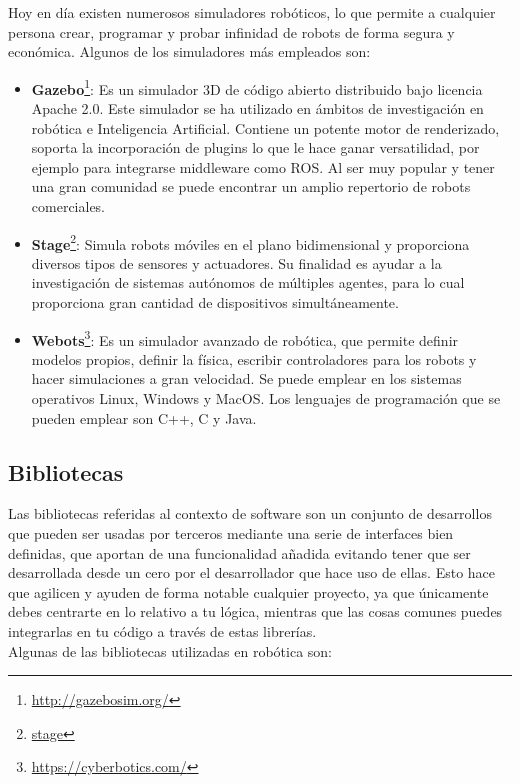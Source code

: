 Hoy en día existen numerosos simuladores robóticos, lo que permite a cualquier persona crear, programar y probar infinidad de robots de forma segura y económica. Algunos de los simuladores más empleados son:

\begin{itemize}
\item \textbf{Gazebo}\footnote{\url{http://gazebosim.org/}}: Es un simulador 3D de código abierto distribuido bajo licencia Apache 2.0. Este simulador se ha utilizado en ámbitos de investigación en robótica e Inteligencia Artificial. Contiene un potente motor de renderizado, soporta la incorporación de plugins lo que le hace ganar versatilidad, por ejemplo para integrarse middleware como ROS. Al ser muy popular y tener una gran comunidad se puede encontrar un amplio repertorio de robots comerciales.
\item \textbf{Stage}\footnote{\href{http://playerstage.sourceforge.net/index.php?src=stage}{stage}}: Simula robots móviles en el plano bidimensional y proporciona diversos tipos de sensores y actuadores. Su finalidad es ayudar a la investigación de sistemas autónomos de múltiples agentes, para lo cual proporciona gran cantidad de dispositivos simultáneamente.
\item \textbf{Webots}\footnote{\url{https://cyberbotics.com/}}: Es un simulador avanzado de robótica, que permite definir modelos propios, definir la física, escribir controladores para los robots y hacer simulaciones a gran velocidad. Se puede emplear en los sistemas operativos Linux, Windows y MacOS. Los lenguajes de programación que se pueden emplear son  C++, C y Java.
\end{itemize}

\subsection{Bibliotecas}
Las bibliotecas referidas al contexto de software son un conjunto de desarrollos que pueden ser usadas por terceros mediante una serie de interfaces bien definidas, que aportan de una funcionalidad añadida evitando tener que ser desarrollada desde un cero por el desarrollador que hace uso de ellas. Esto hace que agilicen y ayuden de forma notable cualquier proyecto, ya que únicamente debes centrarte en lo relativo a tu lógica, mientras que las cosas comunes puedes integrarlas en tu código a través de estas librerías.\\

Algunas de las bibliotecas utilizadas en robótica son:


